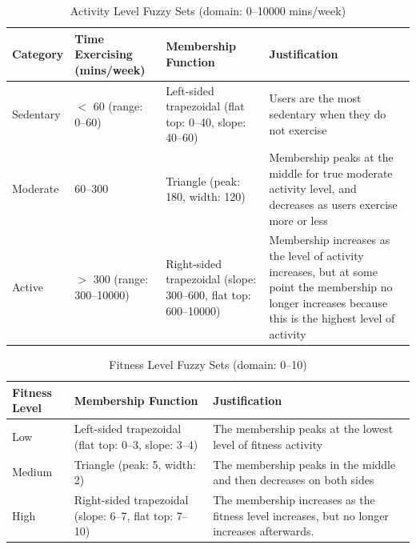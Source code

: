 \documentclass{article}
\begin{document}
\begin{table}[h]
\centering
\begin{tabular}{|l|p{3.5cm}|p{3.5cm}|p{4cm}|}
\hline
\textbf{Category} & \textbf{Time Exercising (mins/week)} & \textbf{Membership Function} & \textbf{Justification} \\
\hline
Sedentary & $<$ 60 \newline (range: 0--60) & Left-sided trapezoidal \newline (flat top: 0--40, slope: 40--60) & Users are the most sedentary when they do not exercise \\
\hline
Moderate & 60--300 & Triangle \newline (peak: 180, width: 120) & Membership peaks at the middle for true moderate activity level, and decreases as users exercise more or less \\
\hline
Active & $>$ 300 \newline (range: 300--10000) & Right-sided trapezoidal \newline (slope: 300--600, flat top: 600--10000) & Membership increases as the level of activity increases, but at some point the membership no longer increases because this is the highest level of activity \\
\hline
\end{tabular}
\caption{Activity Level Fuzzy Sets (domain: 0--10000 mins/week)}
\label{tab:activity}
\end{table}

\begin{table}[h]
\centering
\begin{tabular}{|l|p{3.5cm}|p{6cm}|}
\hline
\textbf{Fitness Level} & \textbf{Membership Function} & \textbf{Justification} \\
\hline
Low & Left-sided trapezoidal \newline (flat top: 0--3, slope: 3--4) & The membership peaks at the lowest level of fitness activity \\
\hline
Medium & Triangle \newline (peak: 5, width: 2) & The membership peaks in the middle and then decreases on both sides \\
\hline
High & Right-sided trapezoidal \newline (slope: 6--7, flat top: 7--10) & The membership increases as the fitness level increases, but no longer increases afterwards. \\
\hline
\end{tabular}
\caption{Fitness Level Fuzzy Sets (domain: 0--10)}
\label{tab:fitness_membership}
\end{table}
\end{document}
